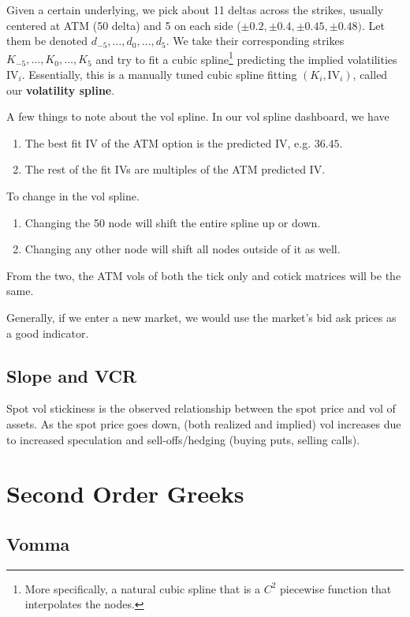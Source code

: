 \documentclass{article}
\begin{document}
    \begin{definition}
      Given a certain underlying, we pick about 11 deltas across the strikes, usually centered at ATM (50 delta) and 5 on each side ($\pm 0.2, \pm 0.4, \pm 0.45, \pm 0.48)$. Let them be denoted $d_{-5}, \ldots, d_0, \ldots, d_5$. We take their corresponding strikes $K_{-5}, \ldots, K_0, \ldots, K_5$ and try to fit a cubic spline\footnote{More specifically, a natural cubic spline that is a $C^2$ piecewise function that interpolates the nodes.} predicting the implied volatilities $\mathrm{IV}_{i}$. Essentially, this is a manually tuned cubic spline fitting $(K_i, \mathrm{IV}_i)$, called our \textbf{volatility spline}. 
    \end{definition} 

    A few things to note about the vol spline. In our vol spline dashboard, we have 
    \begin{enumerate}
      \item The best fit IV of the ATM option is the predicted IV, e.g. $36.45$. 
      \item The rest of the fit IVs are multiples of the ATM predicted IV. 
    \end{enumerate}

    To change in the vol spline. 
    \begin{enumerate}
      \item Changing the 50 node will shift the entire spline up or down. 
      \item Changing any other node will shift all nodes outside of it as well. 
    \end{enumerate}
    
    \begin{definition}
      
    \end{definition}

    \begin{definition}
      
    \end{definition}

    From the two, the ATM vols of both the tick only and cotick matrices will be the same. 

    Generally, if we enter a new market, we would use the market's bid ask prices as a good indicator. 

  \subsection{Slope and VCR}

    Spot vol stickiness is the observed relationship between the spot price and vol of assets. As the spot price goes down, (both realized and implied) vol increases due to increased speculation and sell-offs/hedging (buying puts, selling calls).

\section{Second Order Greeks}

  \subsection{Vomma}
\end{document}
